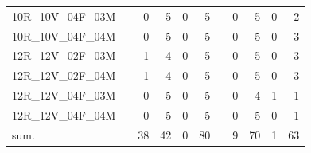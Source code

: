 \begin{tabular}{llrrrrlrrrr}
10R\_10V\_04F\_03M & \hspace{0.1cm} & 0 & 5 & 0 & 5 & \hspace{0.2cm} & 0 & 5 & 0 & 2\\
10R\_10V\_04F\_04M & \hspace{0.1cm} & 0 & 5 & 0 & 5 & \hspace{0.2cm} & 0 & 5 & 0 & 3\\
\addlinespace
12R\_12V\_02F\_03M & \hspace{0.1cm} & 1 & 4 & 0 & 5 & \hspace{0.2cm} & 0 & 5 & 0 & 3\\
12R\_12V\_02F\_04M & \hspace{0.1cm} & 1 & 4 & 0 & 5 & \hspace{0.2cm} & 0 & 5 & 0 & 3\\
12R\_12V\_04F\_03M & \hspace{0.1cm} & 0 & 5 & 0 & 5 & \hspace{0.2cm} & 0 & 4 & 1 & 1\\
12R\_12V\_04F\_04M & \hspace{0.1cm} & 0 & 5 & 0 & 5 & \hspace{0.2cm} & 0 & 5 & 0 & 1\\
\addlinespace
sum. & \hspace{0.1cm} & 38 & 42 & 0 & 80 & \hspace{0.2cm} & 9 & 70 & 1 & 63\\
\bottomrule
\end{tabular}
